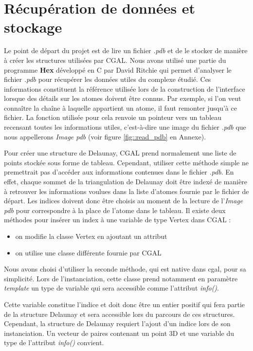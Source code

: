 \section{Récupération de données et stockage}


Le point de départ du projet est de lire un fichier \textit{.pdb} et de le stocker
de manière à créer les structures utilisées par CGAL. Nous avons utilisé une partie du programme
\textbf{Hex} développé en C par David Ritchie qui permet d'analyser le fichier
\textit{.pdb} pour récupérer les données utiles du complexe étudié. Ces informations constituent
la référence utilisée lors de la construction de l'interface lorsque des détails
sur les atomes doivent être connus. Par exemple, si l'on veut connaître la chaîne à
laquelle appartient un atome, il faut remonter jusqu'à ce fichier. La fonction utilisée pour cela
renvoie un pointeur vers un tableau recensant toutes les informations utiles, c'est-à-dire
une image du fichier \textit{.pdb} que nous appellerons \textit{Image pdb} (voir
figure \ref{fig::read_pdb} en Annexe).

Pour créer une structure de Delaunay, CGAL prend normalement une liste de points stockée
sous forme de tableau. Cependant, utiliser cette méthode simple ne premettrait pas d'accéder aux
informations contenues dans le fichier \textit{.pdb}. En effet, chaque sommet de la
triangulation de Delaunay doit être indexé de manière à retrouver les informations voulues dans la
liste d'atomes fournie par le fichier de départ. Les indices doivent donc être choisis
au moment de la lecture de l'\textit{Image pdb} pour correspondre à la place de l'atome
dans le tableau.
Il existe deux méthodes pour insérer un index à une variable de type Vertex dans CGAL :
\begin{itemize}
  \item on modifie la classe Vertex en ajoutant un attribut
  \item on utilise une classe différente fournie par CGAL
\end{itemize}
Nous avons choisi d'utiliser la seconde méthode, qui est native dans \gls{cgal}, pour
sa simplicité. Lors de l'instanciation, cette classe prend notamment en paramètre
\textit{template} un type de variable qui sera accessible comme l'attribut \textit{info()}.

Cette variable constitue l'indice et doit donc être un entier positif qui fera partie de la structure Delaunay
et sera accessible lors du parcours de ces structures. Cependant, la structure de Delaunay
requiert l'ajout d'un indice lors de son instanciation. Un vecteur de paires contenant
un point 3D et une variable du type de l'attribut \textit{info()} convient.

